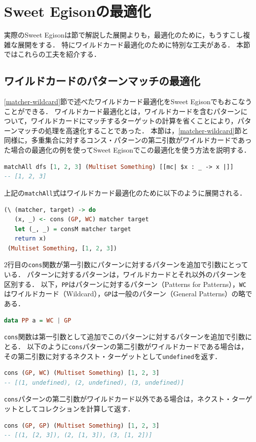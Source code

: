 \section{Sweet Egisonの最適化}\label{sweet-optimize}

実際のSweet Egisonは\label{sweet-mechanism}節で解説した展開よりも，最適化のために，もうすこし複雑な展開をする．
特にワイルドカード最適化のために特別な工夫がある．
本節ではこれらの工夫を紹介する．

\subsection{ワイルドカードのパターンマッチの最適化}

\ref{matcher-wildcard}節で述べたワイルドカード最適化をSweet Egisonでもおこなうことができる．
ワイルドカード最適化とは，ワイルドカードを含むパターンについて，ワイルドカードにマッチするターゲットの計算を省くことにより，パターンマッチの処理を高速化することであった．
本節は，\ref{matcher-wildcard}節と同様に，多重集合に対するコンス・パターンの第二引数がワイルドカードであった場合の最適化の例を使ってSweet Egisonでこの最適化を使う方法を説明する．
\begin{lstlisting}[language=haskell,numbers=none]
matchAll dfs [1, 2, 3] (Multiset Something) [[mc| $x : _ -> x |]]
-- [1, 2, 3]
\end{lstlisting}
上記の\lstinline{matchAll}式はワイルドカード最適化のために以下のように展開される．
\begin{lstlisting}[language=haskell,numbers=none]
(\ (matcher, target) -> do
   (x, _) <- cons (GP, WC) matcher target
   let (_, _) = consM matcher target
   return x)
 (Multiset Something, [1, 2, 3])
\end{lstlisting}
$2$行目の\lstinline{cons}関数が第一引数にパターンに対するパターンを追加で引数にとっている．
パターンに対するパターンは，ワイルドカードとそれ以外のパターンを区別する．
以下，\lstinline{PP}はパターンに対するパターン（Patterns for Patterns），\lstinline{WC}はワイルドカード（Wildcard），\lstinline{GP}は一般のパターン（General Patterns）の略である．
\begin{lstlisting}[language=haskell,numbers=none]
data PP a = WC | GP
\end{lstlisting}
\lstinline{cons}関数は第一引数として追加でこのパターンに対するパターンを追加で引数にとる．
以下のように\lstinline{cons}パターンの第二引数がワイルドカードである場合は，その第二引数に対するネクスト・ターゲットとして\lstinline{undefined}を返す．
\begin{lstlisting}[language=haskell,numbers=none]
cons (GP, WC) (Multiset Something) [1, 2, 3]
-- [(1, undefined), (2, undefined), (3, undefined)]
\end{lstlisting}
\lstinline{cons}パターンの第二引数がワイルドカード以外である場合は，ネクスト・ターゲットとしてコレクションを計算して返す．
\begin{lstlisting}[language=haskell,numbers=none]
cons (GP, GP) (Multiset Something) [1, 2, 3]
-- [(1, [2, 3]), (2, [1, 3]), (3, [1, 2])]
\end{lstlisting}

